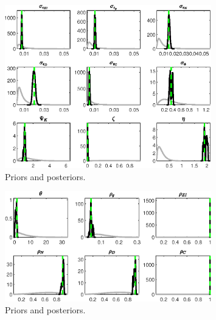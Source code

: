  
\begin{figure}[H]
\centering
\includegraphics[width=0.80\textwidth]{BRS_imp_mobility_alt/Output/BRS_imp_mobility_alt_PriorsAndPosteriors1}
\caption{Priors and posteriors.}\label{Fig:PriorsAndPosteriors:1}
\end{figure}
 
\begin{figure}[H]
\centering
\includegraphics[width=0.80\textwidth]{BRS_imp_mobility_alt/Output/BRS_imp_mobility_alt_PriorsAndPosteriors2}
\caption{Priors and posteriors.}\label{Fig:PriorsAndPosteriors:2}
\end{figure}
 
